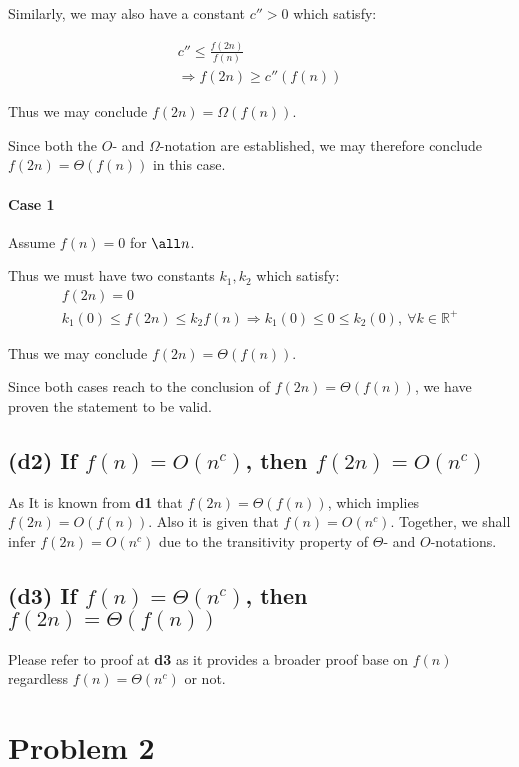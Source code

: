 \documentclass[12pt]{article}
\begin{document}
Similarly, we may also have a constant $c'' > 0$ which satisfy:


\begin{gather}
    c'' \leq \frac{f(2n)}{f(n)} \\
    \Rightarrow f(2n) \geq c''(f(n))
\end{gather}

Thus we may conclude $f(2n) = \Omega(f(n))$.\newline

Since both the $O$- and $\Omega$-notation are established, we may therefore conclude $f(2n) = \Theta(f(n))$ in this case.

\paragraph{Case 1} Assume $f(n) = 0$ for $\all n$.

Thus we must have two constants $k_{1}, k_{2}$ which satisfy:
\begin{gather}
    f(2n) = 0 \\
    k_{1}(0) \leq f(2n) \leq k_{2}f(n)\Rightarrow k_{1}(0) \leq 0 \leq k_{2}(0), \ \forall k \in \mathbb{R^+}
\end{gather}

Thus we may conclude $f(2n) = \Theta(f(n))$.\newline


Since both cases reach to the conclusion of $f(2n) = \Theta(f(n))$, we have proven the statement to be valid.


\subsection{(d2) If $f(n) = O(n^c)$, then $f(2n) = O(n^c)$}

As It is known from \textbf{d1} that $f(2n) = \Theta(f(n))$, which implies $f(2n) = O(f(n))$. Also it is given that $f(n) = O(n^c)$. Together, we shall infer $f(2n) = O(n^c)$ due to the transitivity property of $\Theta$- and $O$-notations.


\subsection{(d3) If $f(n) = \Theta(n^c)$, then $f(2n) = \Theta(f(n))$}
Please refer to proof at \textbf{d3} as it provides a broader proof base on $f(n)$ regardless $f(n) = \Theta(n^c)$ or not.


\section{Problem 2}
\end{document}
